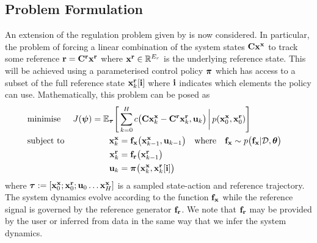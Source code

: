 \subsection{Problem Formulation}
An extension of the regulation problem given by  is now considered. In particular, the problem of forcing a linear combination of the system states $\mathbf{C}\mathbf{x}^{\mathbf{x}}$ to track some reference $\mathbf{r} = \mathbf{C}^{\mathbf{r}}\mathbf{x}^{\mathbf{r}}$ where $\mathbf{x}^{\mathbf{r}} \in \mathbb{R}^{E_r}$ is the underlying reference state. This will be achieved using a parameterised control policy $\boldsymbol{\pi}$ which has access to a subset of the full reference state $\mathbf{x}^{\mathbf{r}}_k[\mathbf{i}]$ where $\mathbf{i}$ indicates which elements the policy can use. Mathematically, this problem can be posed as
\begin{align}
& \text{minimise} & J(\boldsymbol{\psi}) = \mathbb{E}_{\boldsymbol{\tau}}\Bigg[ & \sum_{k=0}^{H} c\big(\mathbf{C}\mathbf{x}^{\mathbf{x}}_k - \mathbf{C}^{\mathbf{r}}\mathbf{x}^{\mathbf{r}}_k,\mathbf{u}_k\big) \, \bigg| \, p(\mathbf{x}^{\mathbf{x}}_0, \mathbf{x}^{\mathbf{r}}_0) \Bigg]
\label{eqn:reftrack1} \\
&\text{subject to} & \mathbf{x}^{\mathbf{x}}_k &= \mathbf{f}_{\mathbf{x}}\big(\mathbf{x}^{\mathbf{x}}_{k-1},\mathbf{u}_{k-1}\big) 
\quad \text{where} \quad \mathbf{f}_{\mathbf{x}} \sim p\big(\mathbf{f}_{\mathbf{x}}|\mathcal{D},\boldsymbol{\theta}\big) & \label{eqn:reftrack2}\\
\nonumber && \mathbf{x}^{\mathbf{r}}_k &= \mathbf{f}_{\mathbf{r}}\big(\mathbf{x}^{\mathbf{r}}_{k-1}\big) \\
\nonumber && \mathbf{u}_k &= \boldsymbol{\pi}\big(\mathbf{x}^{\mathbf{x}}_k, \mathbf{x}^{\mathbf{r}}_k[\mathbf{i}] \big)
\end{align}
where $\boldsymbol{\tau} := [\mathbf{x}^{\mathbf{x}}_0; \mathbf{x}^{\mathbf{r}}_0; \mathbf{u}_0 \dots \mathbf{x}^{\mathbf{x}}_H]$ is a sampled state-action and reference trajectory. The system dynamics evolve according to the function $\mathbf{f}_{\mathbf{x}}$ while the reference signal is governed by the reference generator $\mathbf{f}_{\mathbf{r}}$. We note that $\mathbf{f}_{\mathbf{r}}$ may be provided by the user or inferred from data in the same way that we infer the system dynamics. 


